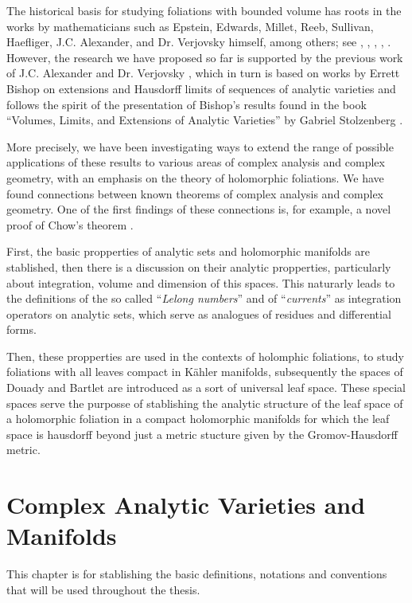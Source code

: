 \documentclass[12pt,twoside,a4paper]{report}
\begin{document}
The historical basis for studying foliations with bounded volume has roots in the works by mathematicians such as Epstein, Edwards, Millet, Reeb, Sullivan, Haefliger, J.C. Alexander, and Dr. Verjovsky himself, among others; see \cite{EMS}, \cite{V-A}, \cite{E-V}, \cite{Epstein1}, \cite{Epstein2}. However, the research we have proposed so far is supported by the previous work of J.C. Alexander and Dr. Verjovsky \cite{A-V}, which in turn is based on works by Errett Bishop \cite{Bishop} on extensions and Hausdorff limits of sequences of analytic varieties and follows the spirit of the presentation of Bishop's results found in the book ``Volumes, Limits, and Extensions of Analytic Varieties'' by Gabriel Stolzenberg \cite{Stolzenberg}.

More precisely, we have been investigating ways to extend the range of possible applications of these results to various areas of complex analysis and complex geometry, with an emphasis on the theory of holomorphic foliations. We have found connections between known theorems of complex analysis and complex geometry. One of the first findings of these connections is, for example, a novel proof of Chow's theorem \cite{Chow}.

First, the basic propperties of analytic sets and holomorphic manifolds are stablished, then there is a discussion on their analytic propperties, particularly about integration, volume and dimension of this spaces. This naturarly leads to the definitions of the so called ``\emph{Lelong numbers}'' and of ``\emph{currents}'' as integration operators on analytic sets, which serve as analogues of residues and differential forms.

Then, these propperties are used in the contexts of holomphic foliations, to study foliations with all leaves compact in Kähler manifolds, subsequently the spaces of Douady and Bartlet are introduced as a sort of universal leaf space. These special spaces serve the purposse of stablishing the analytic structure of the leaf space of a holomorphic foliation in a compact holomorphic manifolds for which the leaf space is hausdorff beyond just a metric stucture given by the Gromov-Hausdorff metric.

\chapter{Complex Analytic Varieties and Manifolds}
\pagestyle{fancy}
\fancyhf{}
\fancyhead[LE]{\rightmark}
\fancyhead[RO]{\leftmark}
\fancyfoot[C]{\thepage}
This chapter is for stablishing the basic definitions, notations and conventions that will be used throughout the thesis. 
\end{document}
